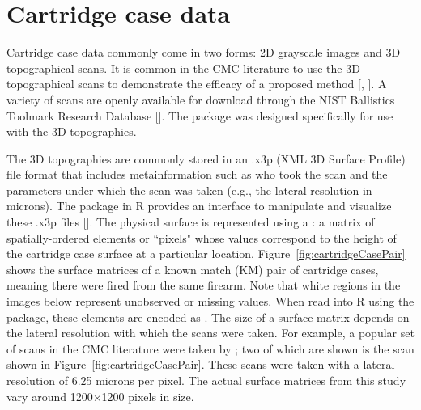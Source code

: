 \section{Cartridge case data} \label{cartridgeCaseData}

Cartridge case data commonly come in two forms: 2D grayscale images and 3D topographical scans. It is common in the CMC literature to use the 3D topographical scans to demonstrate the efficacy of a proposed method [\citet{tong_improved_2015}, \citet{chen_convergence_2017}]. A variety of scans are openly available for download through the NIST Ballistics Toolmark Research Database [\citet{nbtrd}]. The  package was designed specifically for use with the 3D topographies.

The 3D topographies are commonly stored in an .x3p (XML 3D Surface Profile) file format that includes metainformation such as who took the scan and the parameters under which the scan was taken (e.g., the lateral resolution in microns). The  package in R provides an interface to manipulate and visualize these .x3p files [\citet{x3ptools}]. The physical surface is represented using a : a matrix of spatially-ordered elements or ``pixels" whose values correspond to the height of the cartridge case surface at a particular location. Figure~\ref{fig:cartridgeCasePair} shows the surface matrices of a known match (KM) pair of cartridge cases, meaning there were fired from the same firearm. Note that white regions in the images below represent unobserved or missing values. When read into R using the  package, these elements are encoded as . The size of a surface matrix depends on the lateral resolution with which the scans were taken. For example, a popular set of scans in the CMC literature were taken by \citet{fadul_empirical_nodate}; two of which are shown is the scan shown in Figure~\ref{fig:cartridgeCasePair}. These scans were taken with a lateral resolution of 6.25 microns per pixel. The actual surface matrices from this study vary around 1200$\times$1200 pixels in size.

